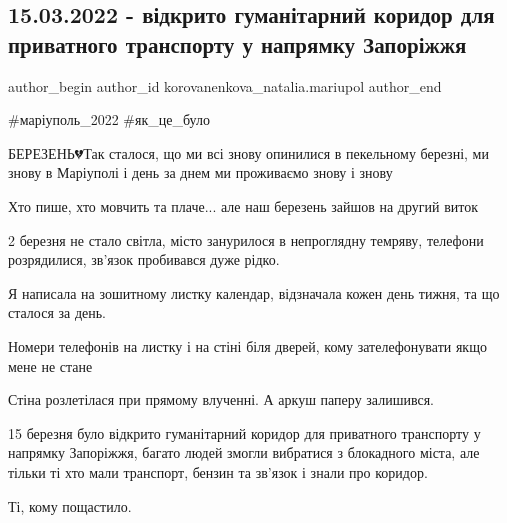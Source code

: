  
 
 
 
 

\subsection{15.03.2022 - відкрито гуманітарний коридор для приватного транспорту у напрямку Запоріжжя}
\label{sec:15_03_2023.fb.korovanenkova_natalia.mariupol.1.gumanitarnyj_koridor_zaporozhie}

\ifcmt
 author_begin
   author_id korovanenkova_natalia.mariupol
 author_end
\fi

\#маріуполь\_2022 \#як\_це\_було

БЕРЕЗЕНЬ💔Так сталося, що ми всі знову опинилися в пекельному березні, ми
знову в Маріуполі і день за днем ми проживаємо знову і знову

Хто пише, хто мовчить та плаче... але наш березень зайшов на другий виток

2 березня не стало світла, місто занурилося в непроглядну темряву, телефони
розрядилися, зв'язок пробивався дуже рідко.

Я написала на зошитному листку календар, відзначала кожен день тижня, та що
сталося за день.

Номери телефонів на листку і на стіні  біля дверей, кому зателефонувати якщо
мене не стане

Стіна розлетілася при прямому влученні. А аркуш паперу залишився.

15 березня було відкрито гуманітарний коридор для приватного транспорту у
напрямку Запоріжжя, багато людей змогли вибратися з блокадного міста, але
тільки ті хто мали транспорт, бензин та зв'язок і знали про коридор.

Ті, кому пощастило.


